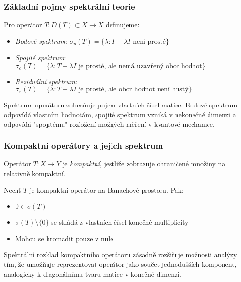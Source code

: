 \subsubsection{Základní pojmy spektrální teorie}

\begin{definition}
Pro operátor $T: D(T) \subset X \to X$ definujeme:
\begin{itemize}
\item \emph{Bodové spektrum}: $\sigma_p(T) = \{\lambda : T - \lambda I \text{ není prosté}\}$
\item \emph{Spojité spektrum}: $\sigma_c(T) = \{\lambda : T - \lambda I \text{ je prosté, ale nemá uzavřený obor hodnot}\}$
\item \emph{Reziduální spektrum}: $\sigma_r(T) = \{\lambda : T - \lambda I \text{ je prosté, ale obor hodnot není hustý}\}$
\end{itemize}
\end{definition}

\begin{intuition}
Spektrum operátoru zobecňuje pojem vlastních čísel matice. Bodové spektrum odpovídá vlastním hodnotám, spojité spektrum vzniká v nekonečné dimenzi a odpovídá "spojitému" rozložení možných měření v kvantové mechanice.
\end{intuition}

\subsubsection{Kompaktní operátory a jejich spektrum}

\begin{definition}
Operátor $T: X \to Y$ je \emph{kompaktní}, jestliže zobrazuje ohraničené množiny na relativně kompaktní.
\end{definition}

\begin{theorem}
Nechť $T$ je kompaktní operátor na Banachově prostoru. Pak:
\begin{itemize}
\item $0 \in \sigma(T)$
\item $\sigma(T) \setminus \{0\}$ se skládá z vlastních čísel konečné multiplicity
\item Mohou se hromadit pouze v nule
\end{itemize}
\end{theorem}

\begin{intuition}
Spektrální rozklad kompaktního operátoru zásadně rozšiřuje možnosti analýzy tím, že umožňuje reprezentovat operátor jako součet jednodušších komponent, analogicky k diagonálnímu tvaru matice v konečné dimenzi.
\end{intuition}

